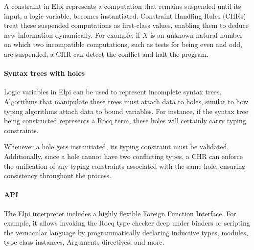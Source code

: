 \documentclass[sigplan,natbib=false]{acmart}
\begin{document}
A constraint in Elpi represents a computation that remains suspended until its
input, a logic variable, becomes instantiated. Constraint Handling Rules (CHRs)
treat these suspended computations as first-class values,
enabling them to deduce new information dynamically.
For example, if \( X \) is an unknown natural number on which two incompatible
computations, such as tests for being even and odd, are suspended,
a CHR can detect the conflict and halt the program.

\paragraph{Syntax trees with holes}

Logic variables in Elpi can be used to represent incomplete syntax trees.
Algorithms that manipulate these trees must attach data to holes,
similar to how typing algorithms attach data to bound variables.
For instance, if the syntax tree being constructed represents a Rocq term,
these holes will certainly carry typing constraints. 

Whenever a hole gets instantiated, its typing constraint must be validated.
Additionally, since a hole cannot have two conflicting types, a CHR can enforce
the unification of any typing constraints associated with the same hole,
ensuring consistency throughout the process.

\paragraph{API}

The Elpi interpreter includes a highly flexible Foreign Function
Interface. For example, it allows invoking the Rocq type checker
deep under binders or scripting the vernacular language by
programmatically declaring inductive types, modules, type class
instances, Arguments directives, and more.
\end{document}
